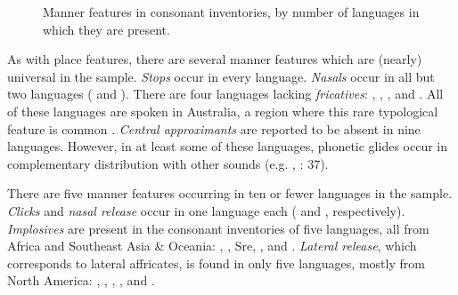   
\begin{figure}

\caption{\label{fig:4.12} Manner features in consonant inventories, by number of languages in which they are present.}
\end{figure}

  As with place features, there are several manner features which are (nearly) universal in the sample. \textit{Stops} occur in every language. \textit{Nasals} occur in all but two languages ( and ). There are four languages lacking \textit{fricatives}: , , , and . All of these languages are spoken in Australia, a region where this rare typological feature is common \citep[42]{Maddieson1984}. \textit{Central approximants} are reported to be absent in nine languages. However, in at least some of these languages, phonetic glides occur in complementary distribution with other sounds (e.g. , \citealt{Olawsky2006}: 37).

  There are five manner features occurring in ten or fewer languages in the sample. \textit{Clicks} and \textit{nasal release} occur in one language each ( and , respectively). \textit{Implosives} are present in the consonant inventories of five languages, all from Africa and Southeast Asia \& Oceania: , , Sre, , and . \textit{Lateral release}, which corresponds to lateral affricates, is found in only five languages, mostly from North America: , , , , and .

